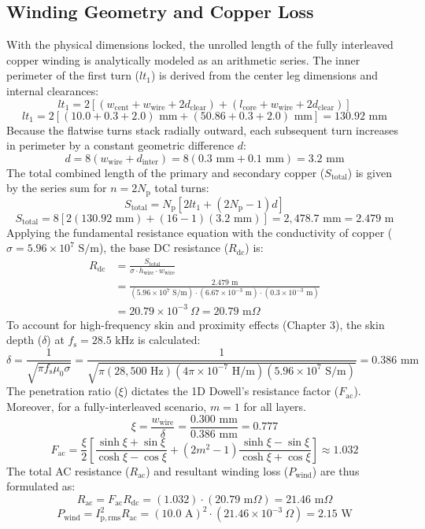 \subsection*{Winding Geometry and Copper Loss}
With the physical dimensions locked, the unrolled length of the fully interleaved copper winding is analytically modeled as an arithmetic series. The inner perimeter of the first turn ($lt_1$) is derived from the center leg dimensions and internal clearances:
$$lt_1 = 2 \left[ (w_{\mathrm{cent}} + w_{\mathrm{wire}} + 2 d_{\mathrm{clear}}) + (l_{\mathrm{core}} + w_{\mathrm{wire}} + 2 d_{\mathrm{clear}}) \right]$$
$$lt_1 = 2 \left[ (10.0 + 0.3 + 2.0) \text{ mm} + (50.86 + 0.3 + 2.0) \text{ mm} \right] = 130.92 \text{ mm}$$
Because the flatwise turns stack radially outward, each subsequent turn increases in perimeter by a constant geometric difference $d$:
$$d = 8 (w_{\mathrm{wire}} + d_{\mathrm{inter}}) = 8 (0.3 \text{ mm} + 0.1 \text{ mm}) = 3.2 \text{ mm}$$
The total combined length of the primary and secondary copper ($S_{\mathrm{total}}$) is given by the series sum for $n = 2 N_{\mathrm{p}}$ total turns:
$$S_{\mathrm{total}} = N_{\mathrm{p}} \left[ 2 lt_1 + (2 N_{\mathrm{p}} - 1) d \right]$$
$$S_{\mathrm{total}} = 8 \left[ 2(130.92 \text{ mm}) + (16 - 1)(3.2 \text{ mm}) \right] = 2,478.7 \text{ mm} = 2.479 \text{ m}$$
Applying the fundamental resistance equation with the conductivity of copper ($\sigma = 5.96 \times 10^7 \text{ S/m}$), the base DC resistance ($R_{\mathrm{dc}}$) is:
$$ \begin{aligned}
    R_{\mathrm{dc}} &= \frac{S_{\mathrm{total}}}{\sigma \cdot h_{\mathrm{wire}} \cdot w_{\mathrm{wire}}} \\
    &= \frac{2.479 \text{ m}}{(5.96 \times 10^7 \text{ S/m}) \cdot (6.67 \times 10^{-3} \text{ m}) \cdot (0.3 \times 10^{-3} \text{ m})} \\
    &= 20.79 \times 10^{-3} \ \Omega = 20.79 \text{ m}\Omega
\end{aligned} $$
To account for high-frequency skin and proximity effects (Chapter 3), the skin depth ($\delta$) at $f_{\mathrm{s}} = 28.5 \text{ kHz}$ is calculated:
$$\delta = \frac{1}{\sqrt{\pi f_{\mathrm{s}} \mu_0 \sigma}} = \frac{1}{\sqrt{\pi (28,500 \text{ Hz}) (4\pi \times 10^{-7} \text{ H/m}) (5.96 \times 10^7 \text{ S/m})}} = 0.386 \text{ mm}$$
The penetration ratio ($\xi$) dictates the 1D Dowell's resistance factor ($F_{\mathrm{ac}}$). Moreover, for a fully-interleaved scenario, $m=1$ for all layers.
$$\xi = \frac{w_{\mathrm{wire}}}{\delta} = \frac{0.300 \text{ mm}}{0.386 \text{ mm}} = 0.777$$
$$F_{\mathrm{ac}} = \frac{\xi}{2} \left[ \frac{\sinh \xi + \sin \xi}{\cosh \xi - \cos \xi} + (2m^2-1)\frac{\sinh \xi - \sin \xi}{\cosh \xi + \cos \xi} \right] \approx 1.032$$
The total AC resistance ($R_{\mathrm{ac}}$) and resultant winding loss ($P_{\mathrm{wind}}$) are thus formulated as:
$$R_{\mathrm{ac}} = F_{\mathrm{ac}} R_{\mathrm{dc}} = (1.032) \cdot (20.79 \text{ m}\Omega) = 21.46 \text{ m}\Omega$$
$$P_{\mathrm{wind}} = I_{\mathrm{p,rms}}^2 R_{\mathrm{ac}} = (10.0 \text{ A})^2 \cdot (21.46 \times 10^{-3} \ \Omega) = 2.15 \text{ W}$$

